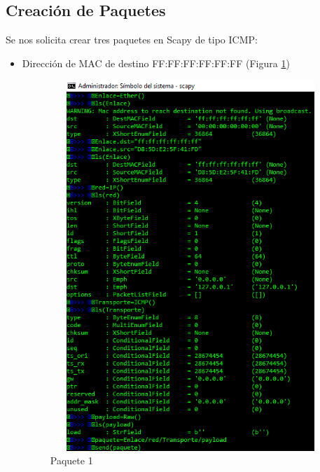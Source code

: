 \documentclass{article}
\begin{document}
\subsection{Creación de Paquetes \vspace{0.3cm}}
Se nos solicita crear tres paquetes en Scapy de tipo ICMP:
\begin{itemize}
    \item Dirección de MAC de destino FF:FF:FF:FF:FF:FF (Figura \ref{fig:paq1})\\
\begin{figure}[h!]
\centering
\includegraphics[scale=05, width=12cm, height=14cm]{sshot-1.png}
\caption{Paquete 1}
\label{fig:paq1}
\end{figure}
    

\end{itemize}
\end{document}
